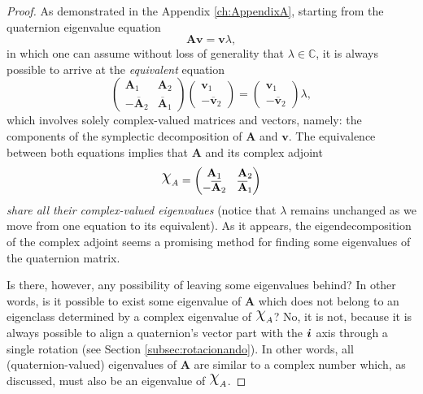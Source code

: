 \begin{proof}
    As demonstrated in the Appendix \ref{ch:AppendixA}, starting from the quaternion eigenvalue equation
    \begin{equation}
        \mathbf{A} \mathbf{v} = \mathbf{v} \lambda,
    \end{equation}
    in which one can assume without loss of generality that $ \lambda \in \mathbb{C} $, it is always possible to arrive at the \emph{equivalent} equation
    \begin{equation}
        \label{eq:eigvalueequation}
        \begin{pmatrix}
            \mathbf{A}_1              & \mathbf{A}_2            \\
            - \overline{\mathbf{A}}_2 & \overline{\mathbf{A}}_1
        \end{pmatrix}
        \begin{pmatrix}
            \mathbf{v}_1 \\
            - \overline{\mathbf{v}}_2
        \end{pmatrix} =
        \begin{pmatrix}
            \mathbf{v}_1 \\
            - \overline{\mathbf{v}}_2
        \end{pmatrix}
        \lambda,
    \end{equation}
    which involves solely complex-valued matrices and vectors, namely: the components of the symplectic decomposition of $ \mathbf{A} $ and $ \mathbf{v} $. The equivalence between both equations implies that $\mathbf{A}$ and its complex adjoint
    \begin{equation}
        \rchi_A =
        \begin{pmatrix}
            \mathbf{A}_1              & \mathbf{A}_2            \\
            - \overline{\mathbf{A}}_2 & \overline{\mathbf{A}}_1
        \end{pmatrix}
    \end{equation}
    \textit{share all their complex-valued eigenvalues} (notice that $\lambda$ remains unchanged as we move from one equation to its equivalent). As it appears, the eigendecomposition of the complex adjoint seems a promising method for finding some eigenvalues of the quaternion matrix.

    Is there, however, any possibility of leaving some eigenvalues behind? In other words, is it possible to exist some eigenvalue of $\mathbf{A}$ which does not belong to an eigenclass determined by a complex eigenvalue of $\rchi_A$? No, it is not, because it is always possible to align a quaternion's vector part with the $\boldsymbol{i}$ axis through a single rotation (see Section \ref{subsec:rotacionando}). In other words,
    all (quaternion-valued) eigenvalues of $\mathbf{A}$ are similar to a complex number which, as discussed, must also be an eigenvalue of $\rchi_A$.


\end{proof}
